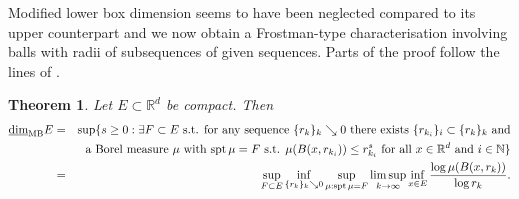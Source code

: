 \documentclass[12pt]{article}
\newcommand{\1}{{\bf 1}}
\DeclareMathOperator{\spt}{spt}
\newcommand\mlbd{\underline{\mbox{\rm dim}}_{\rm MB}} %
\newtheorem{theo}{Theorem}[section]
\begin{document}
Modified lower box  dimension seems to have been neglected compared to its upper counterpart and we now obtain a Frostman-type characterisation involving balls with radii of subsequences of given sequences. Parts of the proof follow the lines of  \cite[Lemma 3.4]{Cu}.

\begin{theo}\label{MB}
Let $E \subset  \mathbb{R}^d$ be compact. Then
\begin{eqnarray*}
\mlbd E 
	&= &\sup \{s  \geq 0:  \exists F\subset E  \text{{\rm  \ s.t.  for any sequence $\{r_k\}_k\searrow 0$ there exists $\{r_{k_i}\}_i\subset\{r_k\}_k$} and}\notag\\ 
&&  \text{{\rm  a Borel  measure $\mu$ with $ \spt\mu=F$ s.t.  $\mu(B(x,r_{k_i}))\leq r_{k_i}^{s }$  for all  $x \in \mathbb{R}^d$ and $i\in \mathbb{N}$\}}}\\
&=& \sup_{F\subset E}\inf_{\{r_k\}_k\searrow 0}  \sup_{\mu:\spt\mu=F}\limsup_{k\to\infty}\inf_{x\in E}\frac{\log\mu(B(x,r_k))}{\log r_k}.
\end{eqnarray*}
\end{theo}  
\end{document}
